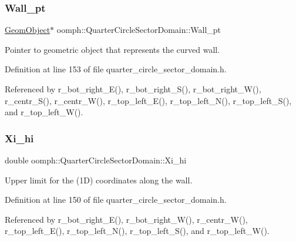 \subsubsection{\texorpdfstring{Wall\+\_\+pt}{Wall\_pt}}
{\footnotesize\ttfamily \hyperlink{classoomph_1_1GeomObject}{Geom\+Object}$\ast$ oomph\+::\+Quarter\+Circle\+Sector\+Domain\+::\+Wall\+\_\+pt\hspace{0.3cm}{\ttfamily [private]}}



Pointer to geometric object that represents the curved wall. 



Definition at line 153 of file quarter\+\_\+circle\+\_\+sector\+\_\+domain.\+h.



Referenced by r\+\_\+bot\+\_\+right\+\_\+\+E(), r\+\_\+bot\+\_\+right\+\_\+\+S(), r\+\_\+bot\+\_\+right\+\_\+\+W(), r\+\_\+centr\+\_\+\+S(), r\+\_\+centr\+\_\+\+W(), r\+\_\+top\+\_\+left\+\_\+\+E(), r\+\_\+top\+\_\+left\+\_\+\+N(), r\+\_\+top\+\_\+left\+\_\+\+S(), and r\+\_\+top\+\_\+left\+\_\+\+W().

\mbox{\label{classoomph_1_1QuarterCircleSectorDomain_aba0cc67782144fe066dd0d04ac9d79dd}} 
\subsubsection{\texorpdfstring{Xi\+\_\+hi}{Xi\_hi}}
{\footnotesize\ttfamily double oomph\+::\+Quarter\+Circle\+Sector\+Domain\+::\+Xi\+\_\+hi\hspace{0.3cm}{\ttfamily [private]}}



Upper limit for the (1D) coordinates along the wall. 



Definition at line 150 of file quarter\+\_\+circle\+\_\+sector\+\_\+domain.\+h.



Referenced by r\+\_\+bot\+\_\+right\+\_\+\+E(), r\+\_\+bot\+\_\+right\+\_\+\+W(), r\+\_\+centr\+\_\+\+W(), r\+\_\+top\+\_\+left\+\_\+\+E(), r\+\_\+top\+\_\+left\+\_\+\+N(), r\+\_\+top\+\_\+left\+\_\+\+S(), and r\+\_\+top\+\_\+left\+\_\+\+W().

